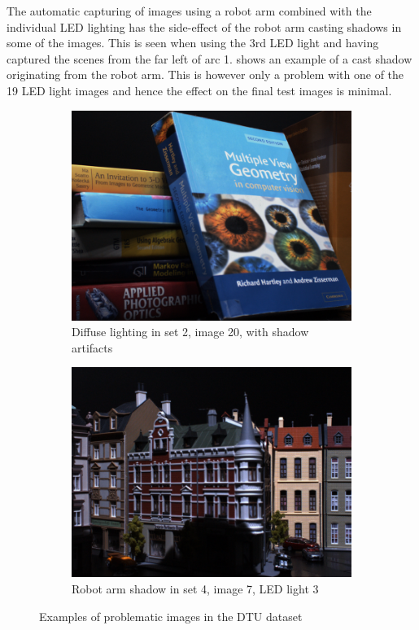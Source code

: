 \documentclass[thesis.tex]{subfiles}
\begin{document}
The automatic capturing of images using a robot arm combined with the individual LED lighting has the side-effect of the robot arm casting shadows in some of the images. This is seen when using the 3rd LED light and having captured the scenes from the far left of arc 1.  shows an example of a cast shadow originating from the robot arm. This is however only a problem with one of the 19 LED light images and hence the effect on the final test images is minimal.
%
\begin{figure}
	\centering
	\begin{subfigure}{0.49\textwidth}
		\includegraphics[width=\textwidth]{img/diffuse_light_problem.png}
		\caption{Diffuse lighting in set 2, image 20, with shadow artifacts}
		\label{fig:dtu_problems_diffuse}
	\end{subfigure}
	\begin{subfigure}{0.49\textwidth}
		\includegraphics[width=\textwidth]{img/robot_arm_shadow.png}
		\caption{Robot arm shadow in set 4, image 7, LED light 3}
		\label{fig:dtu_problems_robot}
	\end{subfigure}
	\caption{Examples of problematic images in the DTU dataset}
	\label{fig:dtu_problems}
\end{figure}
\end{document}
